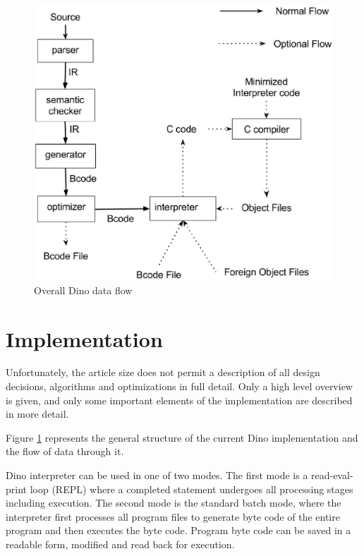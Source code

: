 \documentclass[preprint]{sigplanconf}
\begin{document}
\begin{center}
\begin{figure}[ht]
\begin{center}
\includegraphics[scale=0.5]{Dino_Flow.eps}
\end{center}
\caption{Overall Dino data flow}
\label{fig:Dino-flow}
\end{figure}
\end{center}

\section{Implementation}
  Unfortunately, the article size does not permit a description
of all design decisions, algorithms and optimizations in full detail.
Only a high level overview is given, and only some important elements
of the implementation are described in more detail.
  
  Figure \ref{fig:Dino-flow} represents the general structure of the current Dino
implementation\cite{Makarov} and the flow of data through it.

  Dino interpreter can be used in one of two modes.  The first mode is a read-eval-print 
loop (REPL) where a completed statement undergoes all
processing stages including execution. %
The second mode is the standard batch mode, where the interpreter
first processes all program files to generate byte code of the entire
program and then executes the byte code.  Program byte code can
be saved in a readable form, modified and read back for execution.
\end{document}
